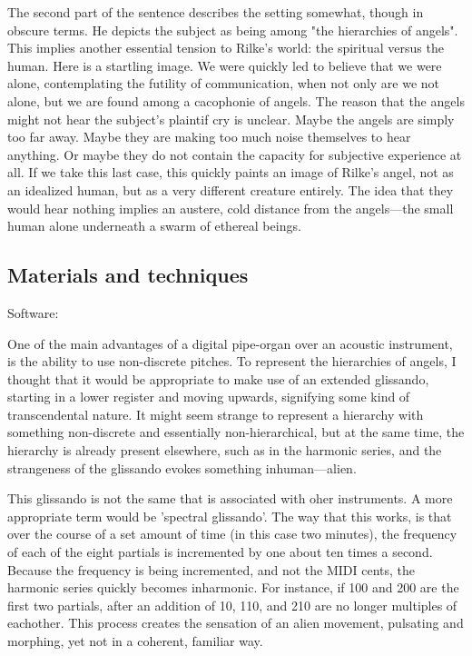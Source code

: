 \documentclass[12pt,twoside,maitrise]{dms_ks}
\theoremstyle{definition}
\begin{document}
{The second part of the sentence describes the setting somewhat, though in obscure terms.
He depicts the subject as being among "the hierarchies of angels".
This implies another essential tension to Rilke's world: the spiritual versus the human.
Here is a startling image.
We were quickly led to believe that we were alone, contemplating the futility of communication, when not only are we not alone, but we are found among a cacophonie of angels.
The reason that the angels might not hear the subject's plaintif cry is unclear. 
Maybe the angels are simply too far away.
Maybe they are making too much noise themselves to hear anything.
Or maybe they do not contain the capacity for subjective experience at all.
If we take this last case, this quickly paints an image of Rilke's angel, not as an idealized human, but as a very different creature entirely.
The idea that they would hear nothing implies an austere, cold distance from the angels---the small human alone underneath a swarm of ethereal beings.

\subsection{Materials and techniques}

Software:

One of the main advantages of a digital pipe-organ over an acoustic instrument, is the ability to use non-discrete pitches.
To represent the hierarchies of angels, I thought that it would be appropriate to make use of an extended glissando, starting in a lower register and moving upwards, signifying some kind of transcendental nature.
It might seem strange to represent a hierarchy with something non-discrete and essentially non-hierarchical, but at the same time, the hierarchy is already present elsewhere, such as in the harmonic series, and the strangeness of the glissando evokes something inhuman---alien.

This glissando is not the same that is associated with oher instruments. A more appropriate term would be 'spectral glissando'. The way that this works, is that over the course of a set amount of time (in this case two minutes), the frequency of each of the eight partials is incremented by one about ten times a second.
Because the frequency is being incremented, and not the MIDI cents, the harmonic series quickly becomes inharmonic.
For instance, if 100 and 200 are the first two partials, after an addition of 10, 110, and 210 are no longer multiples of eachother.
This process creates the sensation of an alien movement, pulsating and morphing, yet not in a coherent, familiar way.    

}
\end{document}
